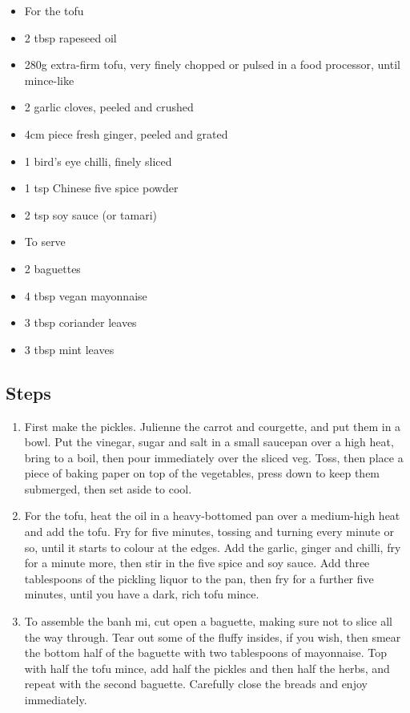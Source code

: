 \documentclass{book}
\begin{document}
\begin{itemize}
\item For the tofu 
\item 2 tbsp rapeseed oil 
\item 280g extra-firm tofu, very finely chopped or pulsed in a food processor, until mince-like 
\item 2 garlic cloves, peeled and crushed 
\item 4cm piece fresh ginger, peeled and grated 
\item 1 bird’s eye chilli, finely sliced 
\item 1 tsp Chinese five spice powder
\item 2 tsp soy sauce (or tamari)
\end{itemize}

\begin{itemize}
\item To serve 
\item 2 baguettes 
\item 4 tbsp vegan mayonnaise 
\item 3 tbsp coriander leaves
\item 3 tbsp mint leaves
\end{itemize}

\subsection*{Steps}
\begin{enumerate}
\item First make the pickles. Julienne the carrot and courgette, and put them in a bowl. Put the vinegar, sugar and salt in a small saucepan over a high heat, bring to a boil, then pour immediately over the sliced veg. Toss, then place a piece of baking paper on top of the vegetables, press down to keep them submerged, then set aside to cool.
\item For the tofu, heat the oil in a heavy-bottomed pan over a medium-high heat and add the tofu. Fry for five minutes, tossing and turning every minute or so, until it starts to colour at the edges. Add the garlic, ginger and chilli, fry for a minute more, then stir in the five spice and soy sauce. Add three tablespoons of the pickling liquor to the pan, then fry for a further five minutes, until you have a dark, rich tofu mince.
\item To assemble the banh mi, cut open a baguette, making sure not to slice all the way through. Tear out some of the fluffy insides, if you wish, then smear the bottom half of the baguette with two tablespoons of mayonnaise. Top with half the tofu mince, add half the pickles and then half the herbs, and repeat with the second baguette. Carefully close the breads and enjoy immediately.
\end{enumerate}
\newpage
\end{document}
